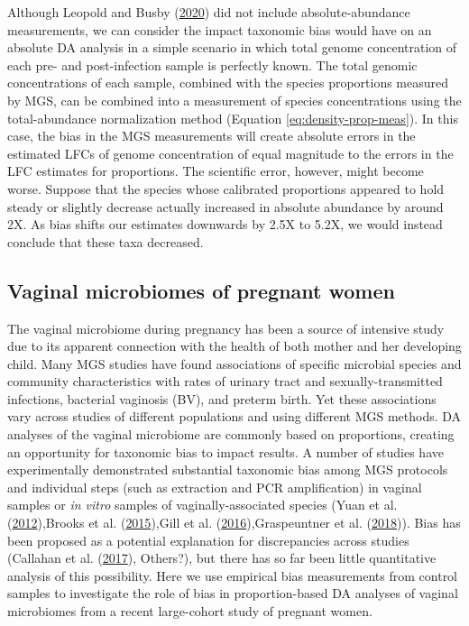 \documentclass[
]{article}
\begin{document}
Although Leopold and Busby (\protect\hyperlink{ref-leopold2020host}{2020}) did not include absolute-abundance measurements, we can consider the impact taxonomic bias would have on an absolute DA analysis in a simple scenario in which total genome concentration of each pre- and post-infection sample is perfectly known.
The total genomic concentrations of each sample, combined with the species proportions measured by MGS, can be combined into a measurement of species concentrations using the total-abundance normalization method (Equation \eqref{eq:density-prop-meas}).
In this case, the bias in the MGS measurements will create absolute errors in the estimated LFCs of genome concentration of equal magnitude to the errors in the LFC estimates for proportions.
The scientific error, however, might become worse.
Suppose that the species whose calibrated proportions appeared to hold steady or slightly decrease actually increased in absolute abundance by around 2X.
As bias shifts our estimates downwards by 2.5X to 5.2X, we would instead conclude that these taxa decreased.

\hypertarget{vaginal-microbiomes-of-pregnant-women}{%
\subsection{Vaginal microbiomes of pregnant women}\label{vaginal-microbiomes-of-pregnant-women}}

The vaginal microbiome during pregnancy has been a source of intensive study due to its apparent connection with the health of both mother and her developing child.
Many MGS studies have found associations of specific microbial species and community characteristics with rates of urinary tract and sexually-transmitted infections, bacterial vaginosis (BV), and preterm birth.
Yet these associations vary across studies of different populations and using different MGS methods.
DA analyses of the vaginal microbiome are commonly based on proportions, creating an opportunity for taxonomic bias to impact results.
A number of studies have experimentally demonstrated substantial taxonomic bias among MGS protocols and individual steps (such as extraction and PCR amplification) in vaginal samples or \emph{in vitro} samples of vaginally-associated species (Yuan et al. (\protect\hyperlink{ref-yuan2012eval}{2012}),Brooks et al. (\protect\hyperlink{ref-brooks2015thet}{2015}),Gill et al. (\protect\hyperlink{ref-gill2016eval}{2016}),Graspeuntner et al. (\protect\hyperlink{ref-graspeuntner2018sele}{2018})).
Bias has been proposed as a potential explanation for discrepancies across studies (Callahan et al. (\protect\hyperlink{ref-callahan2017repl}{2017}), Others?), but there has so far been little quantitative analysis of this possibility.
Here we use empirical bias measurements from control samples to investigate the role of bias in proportion-based DA analyses of vaginal microbiomes from a recent large-cohort study of pregnant women.
\end{document}
